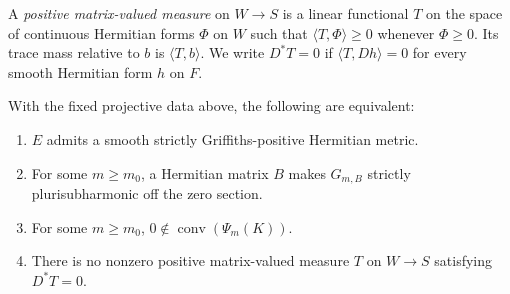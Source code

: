 A \emph{positive matrix-valued measure} on $W\to S$ is a linear functional $T$ on the space of continuous Hermitian forms $\Phi$ on $W$ such that $\langle T,\Phi\rangle\geq0$ whenever $\Phi\geq0$. Its trace mass relative to $b$ is $\langle T,b\rangle$. We write $D^*T=0$ if $\langle T,Dh\rangle=0$ for every smooth Hermitian form $h$ on $F$.

\begin{theorem}\label{thm:projective-first-jet-positive-metric}
With the fixed projective data above, the following are equivalent:
\begin{enumerate}
 \item $E$ admits a smooth strictly Griffiths-positive Hermitian metric.
 \item For some $m\geq m_0$, a Hermitian matrix $B$ makes $G_{m,B}$ strictly plurisubharmonic off the zero section.
 \item For some $m\geq m_0$, $0\notin\operatorname{conv}(\Psi_m(K))$.
 \item There is no nonzero positive matrix-valued measure $T$ on $W\to S$ satisfying $D^*T=0$.
\end{enumerate}
\end{theorem}
